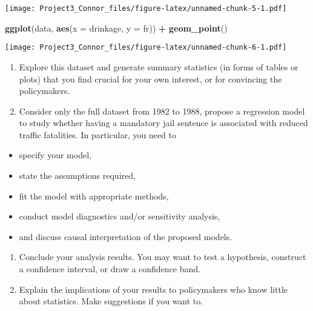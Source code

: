 \documentclass[]{article}
\newenvironment{Shaded}{\begin{snugshade}}{\end{snugshade}}
\newcommand{\DataTypeTok}[1]{\textcolor[rgb]{0.13,0.29,0.53}{#1}}
\newcommand{\KeywordTok}[1]{\textcolor[rgb]{0.13,0.29,0.53}{\textbf{#1}}}
\newcommand{\NormalTok}[1]{#1}
\newcommand{\OperatorTok}[1]{\textcolor[rgb]{0.81,0.36,0.00}{\textbf{#1}}}
\newcommand{\StringTok}[1]{\textcolor[rgb]{0.31,0.60,0.02}{#1}}
\providecommand{\tightlist}{%
  \setlength{\itemsep}{0pt}\setlength{\parskip}{0pt}}
\begin{document}
\texttt{[image: Project3\_Connor\_files/figure-latex/unnamed-chunk-5-1.pdf]}

\begin{Shaded}
\begin{Highlighting}[]
\KeywordTok{ggplot}\NormalTok{(data, }\KeywordTok{aes}\NormalTok{(}\DataTypeTok{x =}\NormalTok{ drinkage, }\DataTypeTok{y =}\NormalTok{ fr)) }\OperatorTok{+}
\StringTok{  }\KeywordTok{geom_point}\NormalTok{()}
\end{Highlighting}
\end{Shaded}

\texttt{[image: Project3\_Connor\_files/figure-latex/unnamed-chunk-6-1.pdf]}

\begin{enumerate}
\def\labelenumi{\arabic{enumi}.}
\item
  Explore this dataset and generate summary statistics (in forms of tables or plots) that you find crucial for your own interest, or for convincing the policymakers.
\item
  Consider only the full dataset from 1982 to 1988, propose a regression model to study whether having a mandatory jail sentence is associated with reduced traffic fatalities. In particular, you need to
\end{enumerate}

\begin{itemize}
\tightlist
\item
  specify your model,
\item
  state the assumptions required,
\item
  fit the model with appropriate methods,
\item
  conduct model diagnostics and/or sensitivity analysis,
\item
  and discuss causal interpretation of the proposed models.
\end{itemize}

\begin{enumerate}
\def\labelenumi{\arabic{enumi}.}
\setcounter{enumi}{2}
\item
  Conclude your analysis results. You may want to test a hypothesis, construct a confidence interval, or draw a confidence band.
\item
  Explain the implications of your results to policymakers who know little about statistics. Make suggestions if you want to.
\end{enumerate}
\end{document}
